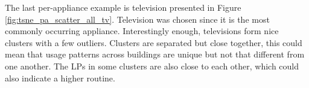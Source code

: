 



The last per-appliance example is television presented in Figure \ref{fig:tsne_pa_scatter_all_tv}. 
Television was chosen since it is the most commonly occurring appliance.
Interestingly enough, televisions form nice clusters with a few outliers.
Clusters are separated but close together, this could mean that usage patterns across buildings are unique
but not that different from one another. 
The LPs in some clusters are also close to each other, which could also indicate 
a higher routine.

